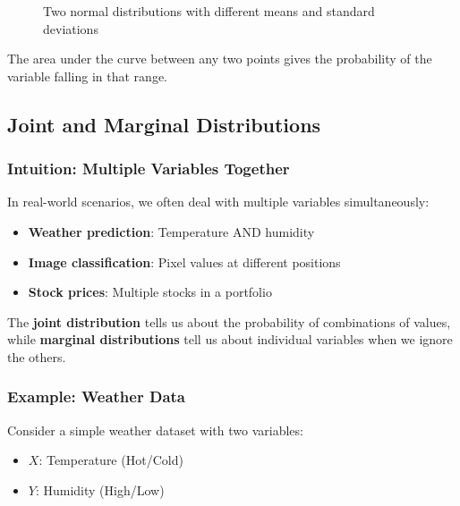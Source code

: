 \begin{figure}[h]
\centering
{}
\caption{Two normal distributions with different means and standard deviations}
\label{fig:normal-distributions}
\end{figure}

The area under the curve between any two points gives the probability of the variable falling in that range.

\subsection{Joint and Marginal Distributions}

\subsubsection{Intuition: Multiple Variables Together}

In real-world scenarios, we often deal with multiple variables simultaneously:
\begin{itemize}
    \item \textbf{Weather prediction}: Temperature AND humidity
    \item \textbf{Image classification}: Pixel values at different positions
    \item \textbf{Stock prices}: Multiple stocks in a portfolio
\end{itemize}

The \textbf{joint distribution} tells us about the probability of combinations of values, while \textbf{marginal distributions} tell us about individual variables when we ignore the others.

\subsubsection{Example: Weather Data}

Consider a simple weather dataset with two variables:
\begin{itemize}
    \item $X$: Temperature (Hot/Cold)
    \item $Y$: Humidity (High/Low)
\end{itemize}

